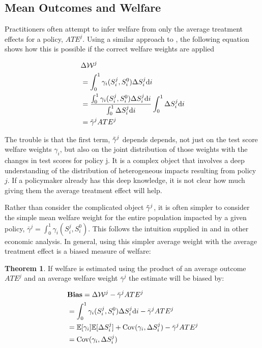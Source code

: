 \documentclass[12pt]{article}
\theoremstyle{definition}
\theoremstyle{definition}
\theoremstyle{definition}
\theoremstyle{definition}
\newtheorem{thm}{Theorem}
\begin{document}
    
    \subsection{Mean Outcomes and Welfare}

    Practitioners often attempt to infer welfare from only the average treatment effects for a policy, $ATE^j$. Using a similar approach to  \cite{Keyser_2020}, the following equation shows how this is possible if the correct welfare weights are applied


    \begin{align}
           & \Delta \mathcal{W}^j \\
           &  = \int_0^1 \gamma_i(S_i^j, S_i^0) \Delta S^j_i \text{d}i\\
           & = \frac{\int_0^1 \gamma_i(S_i^j, S_i^0) \Delta S^j_i \text{d}i}{\int_0^1 \Delta S^j_i \text{d}i} \int_0^1 \Delta S^j_i \text{d}i \\
           & =  \Tilde{\gamma}^j ATE^j 
    \end{align}

    The trouble is that the first term, $\Tilde{\gamma}^j$ depends depends, not just on the test score welfare weights $\gamma_i$, but also on the joint distribution of those weights with the changes in test scores for policy j. It is a complex object that involves a deep understanding of the distribution of heterogeneous impacts resulting from policy $j$. If a policymaker already has this deep knowledge, it is not clear how much giving them the average treatment effect will help.

    Rather than consider the complicated object $\Tilde{\gamma}^j$, it is often simpler to consider the simple mean welfare weight for the entire population impacted by a given policy, $\bar{\gamma}^j = \int_0^1 \gamma_i(S_i^j, S_i^0)$. This follows the intuition supplied in \cite{Keyser_2020} and in other economic analysis. In general, using this simpler average weight with the average treatment effect is a biased measure of welfare:
    
  \begin{thm}
    If welfare is estimated using the product of an average outcome $ATE^j$ and an average welfare weight $\bar{\gamma}^j$ the estimate will be biased by: 
    
    \begin{align}
       & \textbf{Bias} = \Delta \mathcal{W}^j - \bar{\gamma}^j ATE^j \\
       & =   \int_0^1 \gamma_i(S_i^j, S_i^0) \Delta S^j_i \text{d}i - \bar{\gamma}^j ATE^j  \\
       & =  \mathbb{E}[\gamma_i] \mathbb{E}[\Delta S^j_i] + \mathrm{Cov}(\gamma_i, \Delta S^j_i) - \bar{\gamma}^j ATE^j  \\
       & = \mathrm{Cov}(\gamma_i, \Delta S^j_i)
    \end{align}
    \end{thm}
\end{document}
